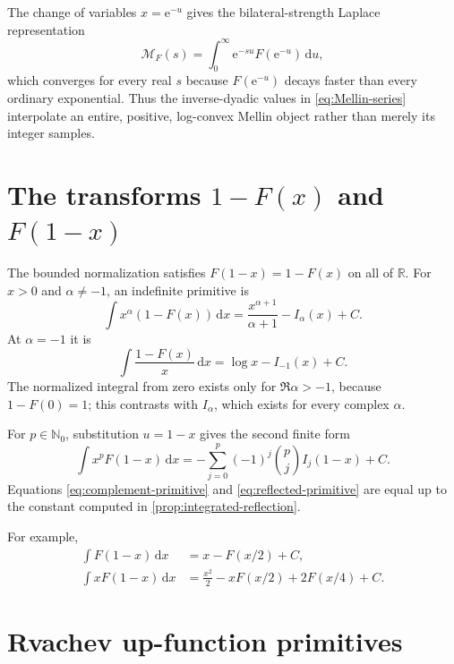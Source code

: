 \documentclass[11pt,oneside]{article}
\numberwithin{equation}{section}
\theoremstyle{definition}
\theoremstyle{remark}
\newcommand{\R}{\mathbb R}
\newcommand{\N}{\mathbb N}
\newcommand{\Mellin}{\mathcal M}
\newcommand{\e}{\mathrm e}
\newcommand{\dd}{\,\mathrm d}
\begin{document}
The change of variables $x=\e^{-u}$ gives the bilateral-strength Laplace
representation
\begin{equation}
 \Mellin_F(s)=\int_0^\infty\e^{-su}F(\e^{-u})\dd u,       \label{eq:Mellin-Laplace}
\end{equation}
which converges for every real $s$ because $F(\e^{-u})$ decays faster than every
ordinary exponential.  Thus the inverse-dyadic values in
\eqref{eq:Mellin-series} interpolate an entire, positive, log-convex Mellin
object rather than merely its integer samples.

\section{\texorpdfstring{The transforms $1-F(x)$ and $F(1-x)$}{The transforms 1-F(x) and F(1-x)}}
\label{sec:transforms}

The bounded normalization satisfies $F(1-x)=1-F(x)$ on all of $\R$.
For $x>0$ and $\alpha\ne-1$, an indefinite primitive is
\begin{equation}
 \boxed{
 \int x^\alpha(1-F(x))\dd x
 =\frac{x^{\alpha+1}}{\alpha+1}-I_\alpha(x)+C.}            \label{eq:complement-primitive}
\end{equation}
At $\alpha=-1$ it is
\begin{equation}
 \int\frac{1-F(x)}x\dd x=\log x-I_{-1}(x)+C.             \label{eq:complement-minus-one}
\end{equation}
The normalized integral from zero exists only for $\Re\alpha>-1$, because
$1-F(0)=1$; this contrasts with $I_\alpha$, which exists for every complex
$\alpha$.

For $p\in\N_0$, substitution $u=1-x$ gives the second finite form
\begin{equation}
 \boxed{
 \int x^pF(1-x)\dd x
 =-\sum_{j=0}^{p}(-1)^j\binom pj I_j(1-x)+C.}              \label{eq:reflected-primitive}
\end{equation}
Equations \eqref{eq:complement-primitive} and
\eqref{eq:reflected-primitive} are equal up to the constant computed in
\cref{prop:integrated-reflection}.

For example,
\begin{align}
 \int F(1-x)\dd x&=x-F(x/2)+C,                             \label{eq:reflect-p0}\\
 \int xF(1-x)\dd x&=\frac{x^2}{2}-xF(x/2)+2F(x/4)+C.      \label{eq:reflect-p1}
\end{align}

\section{Rvachev up-function primitives}
\label{sec:up}
\end{document}
